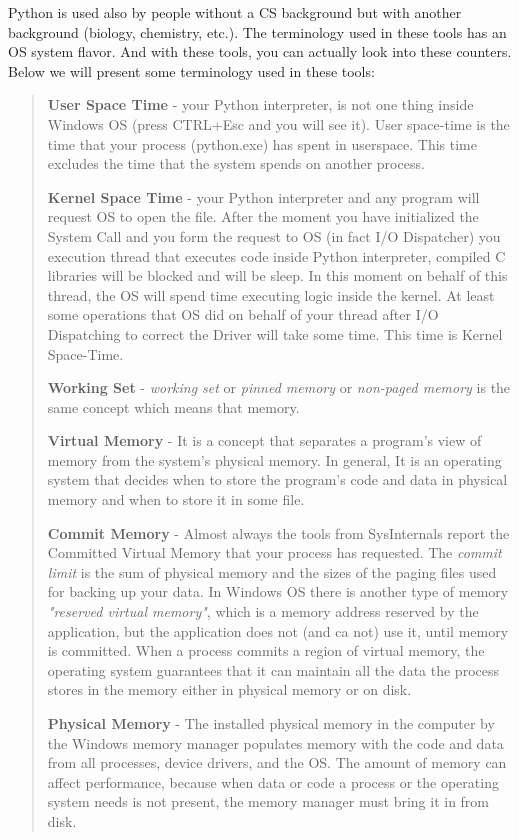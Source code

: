 \documentclass[
]{article}
\begin{document}
Python is used also by people without a CS background but with another
background (biology, chemistry, etc.). The terminology used in these
tools has an OS system flavor. And with these tools, you can actually
look into these counters. Below we will present some terminology used in
these tools:

\begin{quote}
\textbf{User Space Time} - your Python interpreter, is not one thing
inside Windows OS (press CTRL+Esc and you will see it). User space-time
is the time that your process (python.exe) has spent in userspace. This
time excludes the time that the system spends on another process.

\textbf{Kernel Space Time} - your Python interpreter and any program
will request OS to open the file. After the moment you have initialized
the System Call and you form the request to OS (in fact I/O Dispatcher)
you execution thread that executes code inside Python interpreter,
compiled C libraries will be blocked and will be sleep. In this moment
on behalf of this thread, the OS will spend time executing logic inside
the kernel. At least some operations that OS did on behalf of your
thread after I/O Dispatching to correct the Driver will take some time.
This time is Kernel Space-Time.

\textbf{Working Set} - \emph{working set} or \emph{pinned memory} or
\emph{non-paged memory} is the same concept which means that memory.

\textbf{Virtual Memory} - It is a concept that separates a program's
view of memory from the system's physical memory. In general, It is an
operating system that decides when to store the program's code and data
in physical memory and when to store it in some file.

\textbf{Commit Memory} - Almost always the tools from SysInternals
report the Committed Virtual Memory that your process has requested. The
\emph{commit limit} is the sum of physical memory and the sizes of the
paging files used for backing up your data. In Windows OS there is
another type of memory \emph{"reserved virtual memory"}, which is a
memory address reserved by the application, but the application does not
(and ca not) use it, until memory is committed. When a process commits a
region of virtual memory, the operating system guarantees that it can
maintain all the data the process stores in the memory either in
physical memory or on disk.

\textbf{Physical Memory} - The installed physical memory in the computer
by the Windows memory manager populates memory with the code and data
from all processes, device drivers, and the OS. The amount of memory can
affect performance, because when data or code a process or the operating
system needs is not present, the memory manager must bring it in from
disk.


\end{quote}
\end{document}
